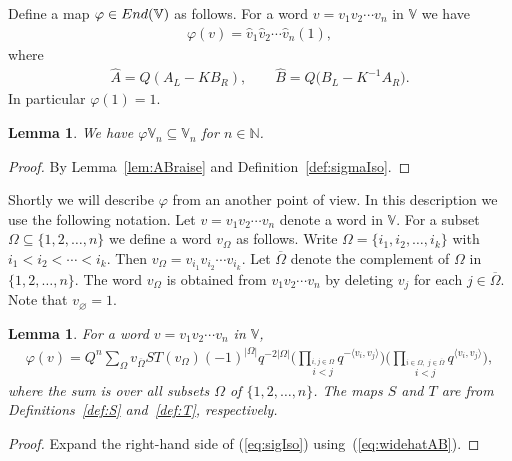 \documentclass[11pt]{article}
\numberwithin{equation}{section}
\numberwithin{equation}{section}
\newtheorem{Lemma}[Theorem]{Lemma}
\begin{document}
{\begin{Definition}\label{def:sigmaIso}Define a map $\varphi \in {\rm End}(\mathbb V)$ as follows. For a word $v=v_1v_2\cdots v_n$ in $\mathbb V$ we have
\begin{gather}\label{eq:sigIso}
\varphi(v) =\widehat v_1\widehat v_2\cdots\widehat v_n (1),
\end{gather}
where
\begin{gather}\label{eq:widehatAB}
\widehat A = Q(A_L-KB_R), \qquad
\widehat B = Q\big(B_L-K^{-1}A_R\big).
\end{gather}
In particular $\varphi (1)=1$.
\end{Definition}

\begin{Lemma}\label{lem:sigmaAct}We have $\varphi \mathbb V_n \subseteq \mathbb V_n$ for $n\in \mathbb N$.
\end{Lemma}
\begin{proof} By Lemma~\ref{lem:ABraise} and Definition~\ref{def:sigmaIso}.
\end{proof}

Shortly we will describe $\varphi$ from an another point of view. In this description we use the following notation. Let $v=v_1v_2\cdots v_n$ denote a word in $\mathbb V$. For a subset $\Omega \subseteq \lbrace 1,2,\ldots, n\rbrace$ we define a word $v_\Omega$ as follows. Write $\Omega = \lbrace i_1,i_2,\ldots, i_k\rbrace $ with $i_1 < i_2 < \cdots < i_k$. Then $v_\Omega = v_{i_1} v_{i_2} \cdots v_{i_k}$. Let $\overline \Omega$ denote the complement of $\Omega$ in $\lbrace 1,2,\ldots, n\rbrace$.
The word $v_{\Omega}$ is obtained from $v_1v_2\cdots v_n$ by deleting $v_j$ for each $j \in \overline \Omega$. Note that $v_\varnothing = 1$.

\begin{Lemma} For a word $v=v_1v_2\cdots v_n$ in $\mathbb V$,
\begin{gather*}
\varphi(v) = Q^n \sum_{\Omega}
v_{\overline \Omega} ST(v_\Omega) (-1)^{|\Omega|} q^{-2|\Omega|}
\Biggl(
\prod_{\stackrel{i,j\in \Omega}{i<j}} q^{-\langle v_i,v_j\rangle}
\Biggr)
\Biggl(
\prod_{\stackrel{i\in \Omega, \;j\in \overline \Omega}
{i<j}} q^{\langle v_i,v_j\rangle}
\Biggr),
\end{gather*}
where the sum is over all subsets $\Omega $ of $\lbrace 1,2,\ldots, n\rbrace$. The maps $S$ and $T$ are from
Definitions~{\rm \ref{def:S}} and~{\rm \ref{def:T}}, respectively.
\end{Lemma}

\begin{proof} Expand the right-hand side of (\ref{eq:sigIso}) using~(\ref{eq:widehatAB}).
\end{proof}

}
\end{document}
